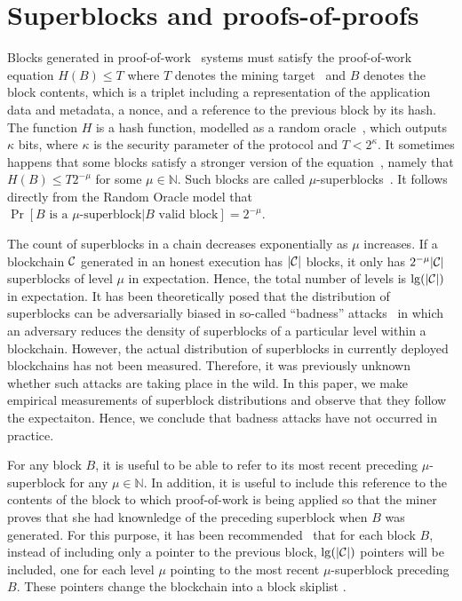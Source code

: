 \section{Superblocks and proofs-of-proofs}

Blocks generated in proof-of-work~\cite{C:DwoNao92} systems must satisfy the
proof-of-work equation $H(B) \leq T$ where $T$ denotes the mining
target~\cite{SP:BMCNKF15} and $B$ denotes the block contents, which is a triplet
including a representation of the application data and metadata, a nonce, and a
reference to the previous block by its hash. The function $H$ is a hash
function, modelled as a random oracle~\cite{CCS:BelRog93}, which outputs
$\kappa$ bits, where $\kappa$ is the security parameter of the protocol and $T <
2^\kappa$. It sometimes happens that some blocks satisfy a stronger version of
the equation~\cite{popow}, namely that $H(B) \leq T2^{-\mu}$ for some $\mu \in
\mathbb{N}$. Such blocks are called $\mu$-superblocks~\cite{nipopows}.
It follows directly from the Random Oracle model that
$\Pr[B \text{ is a } \mu\text{-superblock}|B \text{ valid block}] = 2^{-\mu}$.

The count of superblocks in a chain decreases exponentially as $\mu$ increases.
If a blockchain $\mathcal{C}$ generated in an honest execution has $|\mathcal{C}|$ blocks,
it only has $2^{-\mu}|\mathcal{C}|$ superblocks of level $\mu$ in expectation. Hence,
the total number of levels is $\lg(|\mathcal{C}|)$ in expectation. It has been
theoretically posed that the distribution of superblocks can be adversarially
biased in so-called ``badness'' attacks~\cite{nipopows} in which an adversary
reduces the density of superblocks of a particular level within a blockchain.
However, the actual distribution of superblocks in currently deployed
blockchains has not been measured. Therefore, it was previously unknown whether
such attacks are taking place in the wild. In this paper, we make empirical
measurements of superblock distributions and observe that they follow the
expectaiton. Hence, we conclude that badness attacks have not occurred in
practice.

For any block $B$,
it is useful to be able to refer to its most recent preceding $\mu$-superblock
for any $\mu \in \mathbb{N}$. In addition, it is useful to include this
reference to the contents of the block to which proof-of-work is being applied
so that the miner proves that she had knownledge of the preceding superblock
when $B$ was generated. For this purpose, it has been
recommended~\cite{nipopows} that for each block $B$, instead of including only a
pointer to the previous block, $\lg(|\mathcal{C}|)$ pointers will be included, one
for each level $\mu$ pointing to the most recent $\mu$-superblock preceding $B$.
These pointers change the blockchain into a block skiplist .

